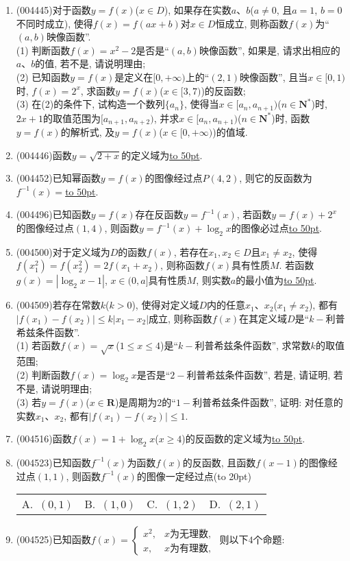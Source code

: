 \documentclass[10pt,a4paper]{article}
\newcommand{\blank}[1]{\underline{\hbox to #1pt{}}}
\newcommand{\bracket}[1]{(\hbox to #1pt{})}
\newcommand{\fourch}[4]{\par\begin{tabular}{p{.23\textwidth}p{.23\textwidth}p{.23\textwidth}p{.23\textwidth}}
A.~#1 &B.~#2& C.~#3& D.~#4
\end{tabular}}
\begin{document}
\begin{enumerate}[1.]
\item {\tiny (004445)}对于函数$y=f(x)$($x\in D$), 如果存在实数$a$、$b$($a\ne 0$, 且$a=1$, $b=0$不同时成立), 使得$f(x)=f(ax+b)$对$x\in D$恒成立, 则称函数$f(x)$为``$(a,b)$映像函数''.\\
(1) 判断函数$f(x)=x^2-2$是否是``$(a,b)$映像函数'', 如果是, 请求出相应的$a$、$b$的值, 若不是, 请说明理由;\\
(2) 已知函数$y=f(x)$是定义在$[0,+\infty)$上的``$(2,1)$映像函数'', 且当$x\in [0,1)$时, $f(x)=2^x$, 求函数$y=f(x)$($x\in [3,7)$)的反函数;\\
(3) 在(2)的条件下, 试构造一个数列$\{a_n\}$, 使得当$x\in [a_n,{a_{n+1}})$($n\in \mathbf{N}^*$)时, $2x+1$的取值范围为$[{a_{n+1}},{a_{n+2}})$, 并求$x\in [a_n,{a_{n+1}})$($n\in \mathbf{N}^*$)时, 函数$y=f(x)$的解析式, 及$y=f(x)$($x\in [0,+\infty)$)的值域.
\item {\tiny (004446)}函数$y=\sqrt{2+x}$的定义域为\blank{50}.
\item {\tiny (004452)}已知幂函数$y=f(x)$的图像经过点$P(4,2)$, 则它的反函数为$f^{-1}(x)=$\blank{50}.
\item {\tiny (004496)}已知函数$y=f(x)$存在反函数$y=f^{-1}(x)$, 若函数$y=f(x)+2^x$的图像经过点$(1,4)$, 则函数$y=f^{-1}(x)+\log_2x$的图像必过点\blank{50}.
\item {\tiny (004500)}对于定义域为$D$的函数$f(x)$, 若存在$x_1,x_2\in D$且$x_1\ne x_2$, 使得$f(x_1^2)=f(x_2^2)=2f(x_1+x_2)$, 则称函数$f(x)$具有性质$M$. 若函数$g(x)=|\log_2x-1|$, $x\in (0,a]$具有性质$M$, 则实数$a$的最小值为\blank{50}.
\item {\tiny (004509)}若存在常数$k$($k>0$), 使得对定义域$D$内的任意$x_1$、$x_2$($x_1\ne x_2$), 都有$|f(x_1)-f(x_2)|\le k|x_1-x_2|$成立, 则称函数$f(x)$在其定义域$D$是``$k-$利普希兹条件函数''.\\
(1) 若函数$f(x)=\sqrt x$($1\le x\le 4$)是``$k-$利普希兹条件函数'', 求常数$k$的取值范围;\\
(2) 判断函数$f(x)=\log_2x$是否是``$2-$利普希兹条件函数'', 若是, 请证明, 若不是, 请说明理由;\\
(3) 若$y=f(x)$($x\in \mathbf{R}$)是周期为2的``$1-$利普希兹条件函数'', 证明: 对任意的实数$x_1$、$x_2$, 都有$|f(x_1)-f(x_2)|\le 1$.
\item {\tiny (004516)}函数$f(x)=1+\log_2x$($x\ge 4$)的反函数的定义域为\blank{50}.
\item {\tiny (004523)}已知函数$f^{-1}(x)$为函数$f(x)$的反函数, 且函数$f(x-1)$的图像经过点$(1,1)$, 则函数$f^{-1}(x)$的图像一定经过点\bracket{20}
\fourch{$(0,1)$}{$(1,0)$}{$(1,2)$}{$(2,1)$}
\item {\tiny (004525)}已知函数$f(x)=\begin{cases} x^2, & x\text{为无理数}, \\ x, &x\text{为有理数},   \end{cases}$ 则以下$4$个命题:

\end{enumerate}
\end{document}
